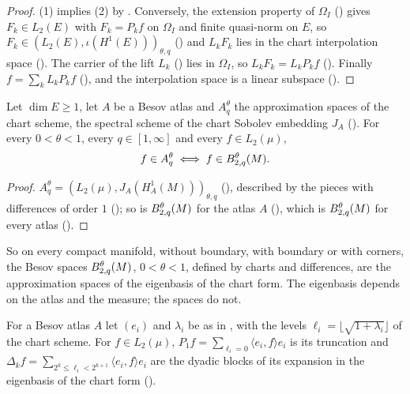 \begin{proof}
\leanok
(1) implies (2) by . Conversely, the extension property of
$\Omega_I$ () gives $F_k \in L_2(E)$ with $F_k = P_k f$ on
$\Omega_I$ and finite quasi-norm on $E$, so $F_k \in (L_2(E), \iota(H^1(E)))_{\theta, q}$
() and $L_k F_k$ lies in the chart interpolation space
(). The carrier of the lift $L_k$ () lies in
$\Omega_I$, so $L_k F_k = L_k P_k f$ ().
Finally $f = \sum_k L_k P_k f$ (), and the interpolation space is a linear
subspace ().
\end{proof}

\begin{theorem}
\label{thm:spectral-besov-manifold}
\leanok
{}
Let $\dim E \geq 1$, let $A$ be a Besov atlas and $A^\theta_q$ the approximation spaces of the
chart scheme, the spectral scheme of the chart Sobolev embedding $J_A$
(). For every $0 < \theta < 1$, every $q \in [1, \infty]$
and every $f \in L_2(\mu)$,
\[
  f \in A^\theta_q \iff f \in B^{\theta}_{2,q}(M) .
\]
\end{theorem}

\begin{proof}
\leanok
$A^\theta_q = (L_2(\mu), J_A(H^1_A(M)))_{\theta, q}$
(), described by the pieces with differences of order
$1$ (); so is $B^{\theta}_{2,q}(M)$ for the atlas $A$
(), which is $B^{\theta}_{2,q}(M)$ for every atlas
().
\end{proof}

So on every compact manifold, without boundary, with boundary or with corners, the Besov spaces
$B^{\theta}_{2,q}(M)$, $0 < \theta < 1$, defined by charts and differences, are the
approximation spaces of the eigenbasis of the chart form. The eigenbasis depends on the atlas and
the measure; the spaces do not.

For a Besov atlas $A$ let $(e_i)$ and $\lambda_i$ be as in , with the
levels $\ell_i = \lfloor \sqrt{1 + \lambda_i} \rfloor$ of the chart scheme. For $f \in L_2(\mu)$,
$P_1 f = \sum_{\ell_i = 0} \langle e_i, f \rangle e_i$ is its truncation and
$\Delta_k f = \sum_{2^k \leq \ell_i < 2^{k+1}} \langle e_i, f \rangle e_i$ are the dyadic blocks
of its expansion in the eigenbasis of the chart form ().

